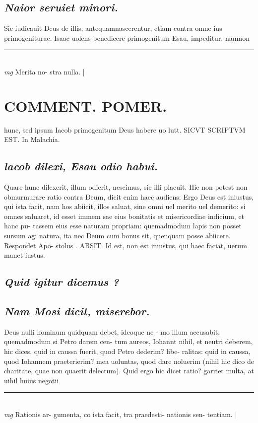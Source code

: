 \documentclass{article}
\begin{document}
\begin{pages}
\subsection*{\textit{Naior seruiet minori. }}\pstart Sic iudicauit Deus de illis, antequamnascerentur, etiam contra omne ius primogeniturae. Isaac uolens benedicere primogenitum Esau, impeditur, namnon  \pend
\vspace{0.5cm}\noindent
\vspace{0.2cm}\rule{1cm}{0.2pt}\\ 
\hspace{0.2cm}\textit{mg}
\footnotesize Merita no- stra nulla.  
\normalsize| 
\section*{COMMENT. POMER.  }\pstart hunc, sed ipsum Iacob primogenitum Deus habere uo lutt. SICVT SCRIPTVM EST. In Malachia.  \pend
{}
{}
\subsection*{\textit{lacob dilexi, Esau odio habui. }}\pstart Quare hunc dilexerit, illum odierit, nescimus, sic illi placuit.   \pend\pstart Hic non potest non obmurmurare ratio contra Deum, dicit enim haec audiens: Ergo Deus est iniustus, qui ista facit, nam hos abiicit, illos saluat, sine omni uel merito uel demerito: si omnes saluaret, id esset immem sae eius bonitatis et misericordiae indicium, et hanc pu- tassem eius esse naturam propriam: quemadmodum lapis non posset sursum agi natura, ita nec Deum cum bonus sit, quenquam posse abiicere. Respondet Apo- stolus . ABSIT. Id est, non est iniustus, qui haec faciat, uerum manet iustus.   \pend
{}
{}
\subsection*{\textit{Quid igitur dicemus ? }}
{}
\subsection*{\textit{Nam Mosi dicit, miserebor. }}\pstart Deus nulli hominum quidquam debet, ideoque ne - mo illum accusabit: quemadmodum si Petro darem cen- tum aureos, Iohannt nihil, et neutri deberem, hic dices, quid in caussa fuerit, quod Petro dederim? libe- ralitas: quid in caussa, quod Iohannem praeterierim? mea uoluntas, quod dare noluerim (nihil hic dico de charitate, quae non quaerit delectum). Quid ergo hic dicet ratio? garriet multa, at uihil huius negotii  \pend
\vspace{0.5cm}\noindent
\vspace{0.2cm}\rule{1cm}{0.2pt}\\ 
\hspace{0.2cm}\textit{mg}
\footnotesize Rationis ar- gumenta, co ista facit, tra praedesti- nationis sen- tentiam.  
\normalsize| 

\end{pages}
\end{document}
